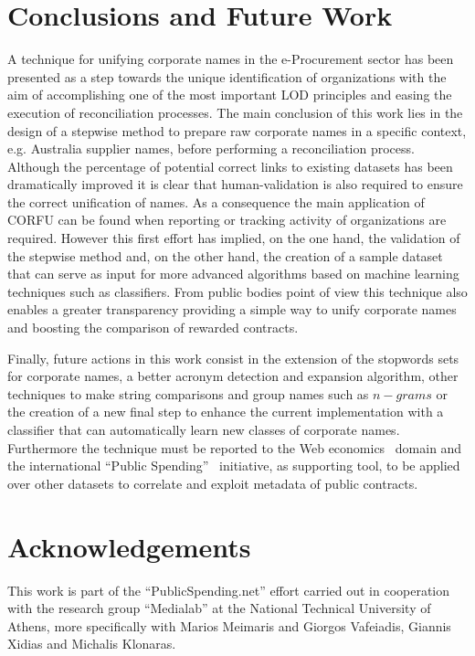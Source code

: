 \documentclass{llncs}
\begin{document}
\section{Conclusions and Future Work}
A technique for unifying corporate names in the e-Procurement sector has been 
presented as a step towards the unique identification of organizations 
with the aim of accomplishing one of the most important LOD principles 
and easing the execution of reconciliation processes. The main conclusion of this work 
lies in the design of a stepwise method to prepare raw corporate names in a specific 
context, e.g. Australia supplier names, before performing a reconciliation process. 
Although the percentage of potential correct links to existing datasets has been dramatically 
improved it is clear that human-validation is also required to ensure the 
correct unification of names. As a consequence the main application of CORFU 
can be found when reporting or tracking activity of organizations are required. 
However this first effort has implied, on the one hand, the validation 
of the stepwise method and, on the other hand, the creation of a sample dataset 
that can serve as input for more advanced algorithms based on machine learning 
techniques such as classifiers. From public bodies point of view 
this technique also enables a greater transparency providing a simple 
way to unify corporate names and boosting the comparison of rewarded contracts.

Finally, future actions in this work consist in the extension of the stopwords sets 
for corporate names, a better acronym detection and expansion algorithm, other techniques to 
make string comparisons and group names such as $n-grams$ or the creation of a new final step to enhance 
the current implementation with a classifier that can automatically learn new classes of corporate names. 
Furthermore the technique must be reported to the Web economics~\cite{vaf2012} domain and the international ``Public Spending''~\cite{vaf2012a} initiative, as supporting tool, 
to be applied over other datasets to correlate and exploit metadata of public contracts.


\section{Acknowledgements}
This work is part of the ``PublicSpending.net'' effort carried out in cooperation with 
the research group ``Medialab'' at the National Technical University of Athens, more specifically with 
Marios Meimaris and Giorgos Vafeiadis, Giannis Xidias and Michalis Klonaras.
\end{document}
